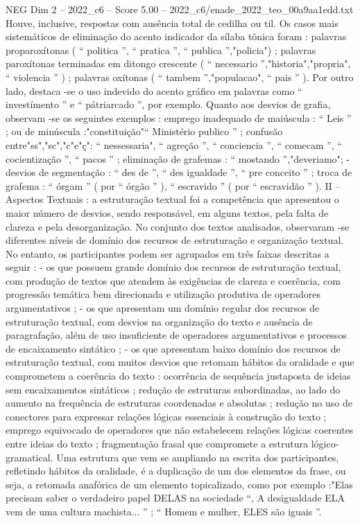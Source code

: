 \begin{textsample}{NEG Dim 2 – 2022\_c6 – Score 5.00 – 2022\_c6/enade\_2022\_teo\_00a9aa1edd.txt}
Houve, inclusive, respostas com ausência total de cedilha ou til.
Os casos mais sistemáticos de eliminação do acento indicador da sílaba tônica foram : palavras proparoxítonas ( “ politica ”, “ pratica ”, “ publica ”,"policia") ; palavras paroxítonas terminadas em ditongo crescente ( “ necessario ”,"historia","propria", “ violencia ” ) ; palavras oxítonas ( “ tambem ”,"populacao", “ pais ” ).
Por outro lado, destaca -se o uso indevido do acento gráfico em palavras como “ investímento ” e “ pátriarcado ”, por exemplo.
Quanto aos desvios de grafia, observam -se os seguintes exemplos : emprego inadequado de maiúscula : “ Leis ” ; ou de minúscula :"constituição"“ Ministério publico ” ; confusão entre"ss","sc","c"e"ç": “ nessessaria", “ agreção ”, “ conciencia ”, “ comecam ”, “ cocientização ”, “ pacos ” ; eliminação de grafemas : “ mostando ”,"deveriamo"; - desvios de segmentação : “ des de ”, “ des igualdade ”, “ pre conceito ” ; troca de grafema : “ órgam ” ( por “ órgão ” ), “ escravido ” ( por “ escravidão ” ).
II – Aspectos Textuais : a estruturação textual foi a competência que apresentou o maior número de desvios, sendo responsável, em alguns textos, pela falta de clareza e pela desorganização.
No conjunto dos textos analisados, observaram -se diferentes níveis de domínio dos recursos de estruturação e organização textual.
No entanto, os participantes podem ser agrupados em três faixas descritas a seguir : - os que possuem grande domínio dos recursos de estruturação textual, com produção de textos que atendem às exigências de clareza e coerência, com progressão temática bem direcionada e utilização produtiva de operadores argumentativos ; - os que apresentam um domínio regular dos recursos de estruturação textual, com desvios na organização do texto e ausência de paragrafação, além de uso insuficiente de operadores argumentativos e processos de encaixamento sintático ; - os que apresentam baixo domínio dos recursos de estruturação textual, com muitos desvios que retomam hábitos da oralidade e que comprometem a coerência do texto : ocorrência de sequência justaposta de ideias sem encaixamentos sintáticos ; redução de estruturas subordinadas, ao lado do aumento na frequência de estruturas coordenadas e absolutas ; redução no uso de conectores para expressar relações lógicas essenciais à construção do texto ; emprego equivocado de operadores que não estabelecem relações lógicas coerentes entre ideias do texto ; fragmentação frasal que compromete a estrutura lógico-gramatical.
Uma estrutura que vem se ampliando na escrita dos participantes, refletindo hábitos da oralidade, é a duplicação de um dos elementos da frase, ou seja, a retomada anafórica de um elemento topicalizado, como por exemplo :"Elas precisam saber o verdadeiro papel DELAS na sociedade “, A desigualdade ELA vem de uma cultura machista... ” ; “ Homem e mulher, ELES são iguais ”.

\end{textsample}
